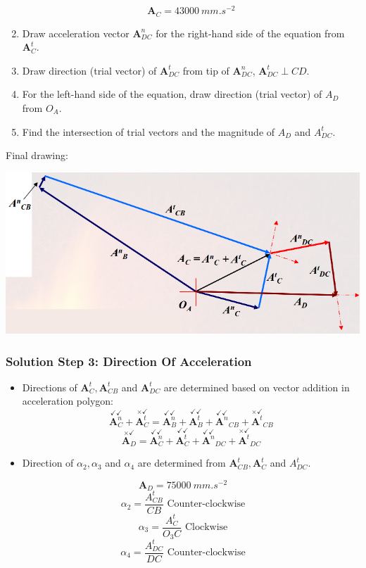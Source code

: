 \documentclass[11pt]{article}
\begin{document}
\begin{enumerate}
\[\boldsymbol{A}_C = \qty{43000}{mm.s^{-2}}\]
\item Draw acceleration vector \(\boldsymbol{A}_{DC}^n\) for the right-hand side of the equation from \(\boldsymbol{A}_C^t\).
\item Draw direction (trial vector) of \(\boldsymbol{A}_{DC}^t\) from tip of \(\boldsymbol{A}_{DC}^n\), \(\boldsymbol{A}_{DC}^t \perp CD\).
\item For the left-hand side of the equation, draw direction (trial vector) of \(A_D\) from \(O_A\).
\item Find the intersection of trial vectors and the magnitude of \(A_D\) and \(A_{DC}^t\).
\end{enumerate}

Final drawing:
\begin{center}
\includegraphics[width=.9\linewidth]{./images/combination-of-basic-linkages-graphical-analysis-acceleration-polygon.png}
\end{center}
\subsubsection{Solution Step 3: Direction Of Acceleration}
\label{sec:orga37bd7d}
\begin{itemize}
\item Directions of \(\boldsymbol{A}_C^t, \boldsymbol{A}_{CB}^t\) and \(\boldsymbol{A}_{DC}^t\) are determined based on vector addition in acceleration polygon:
\[\overset{\checkmark \checkmark}{\boldsymbol{A}_C^n} + \overset{\times \checkmark}{\boldsymbol{A}_C^t} = \overset{\checkmark \checkmark}{\boldsymbol{A}_B^n} + \overset{\checkmark \checkmark}{\boldsymbol{A}_B^t} + \overset{\checkmark \checkmark}{\boldsymbol{A}^n}_{CB} + \overset{\times \checkmark}{\boldsymbol{A}^t}_{CB}\]
\[\overset{\times \checkmark}{\boldsymbol{A}_D} = \overset{\checkmark \checkmark}{\boldsymbol{A}_C^n} + \overset{\checkmark \checkmark}{\boldsymbol{A}_C^t} + \overset{\checkmark \checkmark}{\boldsymbol{A}^n}_{DC} + \overset{\times \checkmark}{\boldsymbol{A}^t}_{DC}\]
\item Direction of \(\alpha_2, \alpha_3\) and \(\alpha_4\) are determined from \(\boldsymbol{A}_{CB}^t, \boldsymbol{A}_C^t\) and \(A_{DC}^t\).
\end{itemize}
\[\boldsymbol{A}_D = \qty{75000}{mm.s^{-2}}\]
\[\alpha_2 = \frac{A_{CB}^t}{CB} \text{ Counter-clockwise}\]
\[\alpha_3 = \frac{A_{C}^t}{O_3 C} \text{ Clockwise}\]
\[\alpha_4 = \frac{A_{DC}^t}{DC} \text{ Counter-clockwise}\]
\end{document}
